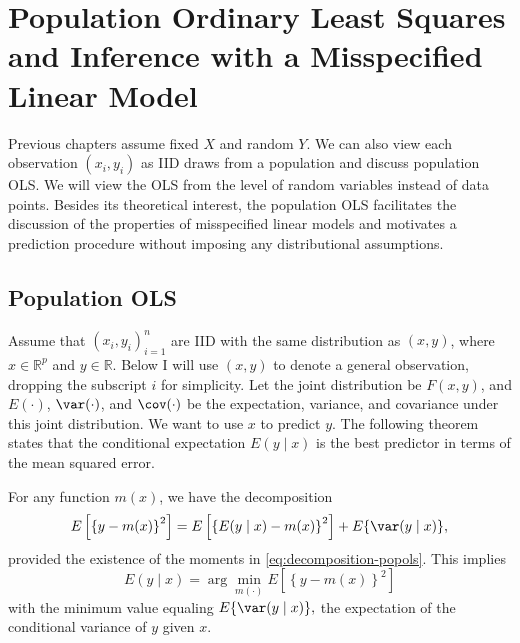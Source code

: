  
\chapter{Population Ordinary Least Squares and Inference with a Misspecified Linear Model}
 
 
 Previous chapters assume fixed $X$ and random $Y$. We can also view each observation $(x_i, y_i)$ as IID draws from a population and discuss population OLS. We will view the OLS from the level of random variables instead of data points. Besides its theoretical interest, the population OLS  facilitates the discussion of the properties of misspecified linear models and motivates a prediction procedure without imposing any distributional assumptions. 
 
 

\section{Population OLS}

Assume that $(x_{i},y_{i})_{i=1}^{n}$ are IID with the same distribution
as $(x,y)$, where $x\in\mathbb{R}^{p}$ and $y\in\mathbb{R}$. 
Below I will use $(x,y)$ to denote a general observation, dropping the subscript $i$ for simplicity. 
Let
the joint distribution be $F(x,y)$, and $E(\cdot)$, $\var(\cdot)$,
and $\cov(\cdot)$ be the expectation, variance, and covariance under
this joint distribution. We want to use $x$ to predict $y$.
The following theorem states that the conditional expectation $E(y\mid x)$
is the best predictor in terms of the mean squared error.
\begin{theorem}\label{thm::equivalent-definition-of-conditional-mean}
For any function $m(x)$, we have the decomposition 
\begin{equation}
E\left[\left\{ y-m(x)\right\} ^{2}\right]=E\left[\left\{ E(y\mid x)-m(x)\right\} ^{2}\right]+ E\{ \var(y\mid x) \},\label{eq:decomposition-popols}
\end{equation}
provided the existence of the moments in \eqref{eq:decomposition-popols}. This implies
\[
E(y\mid x)=\arg\min_{m(\cdot)}E\left[\left\{ y-m(x)\right\} ^{2}\right]
\]
with the minimum value equaling $E\{ \var(y\mid x)\} ,$ the expectation of the conditional
variance of $y$ given $x$. 
\end{theorem}

 

